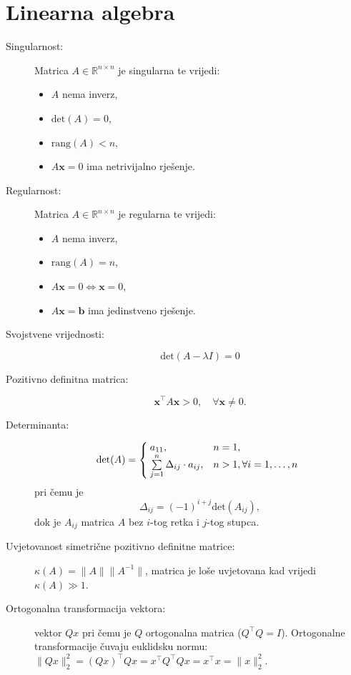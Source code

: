 \documentclass{article}
\begin{document}
\section{Linearna algebra}
\begin{description}
  \item[Singularnost:] Matrica $A \in \mathbb R^{n \times n}$ je singularna te vrijedi:
  \begin{itemize}
    \item $A$ nema inverz,
    \item $\textrm{det}(A) = 0$,
    \item $\textrm{rang}(A) < n$,
    \item $A \mathbf x = 0$ ima netrivijalno rješenje.
  \end{itemize}
  \item[Regularnost:] Matrica $A \in \mathbb R^{n \times n}$ je regularna te vrijedi:
  \begin{itemize}
    \item $A$ nema inverz,
    \item $\textrm{rang}(A) = n$,
    \item $A \mathbf x = 0 \Leftrightarrow \mathbf x = 0$, 
    \item $A \mathbf x = \mathbf b$ ima jedinstveno rješenje.
  \end{itemize}
  \item[Svojstvene vrijednosti:]
  $$\textrm{det}(A-\lambda I) = 0$$
  \item[Pozitivno definitna matrica:]
  $$\mathbf x^\top A \mathbf x > 0, \quad \forall \mathbf x \neq 0.$$
  \item[Determinanta:]
  $$\textrm{det}(A) = \left\{
    \begin{array}{@{\>}l@{\quad}l}
    a_{11}, & n = 1,\\
    \sum\limits_{j=1}^n \Delta_{ij}\cdot a_{ij}, & n > 1, \forall i = 1,\ldots ,n
    \end{array}
    \right.$$
  pri čemu je
  $$\Delta_{ij} = (-1)^{i+j} \textrm{det}(A_{ij}),$$
  dok je $A_{ij}$ matrica $A$ bez $i$-tog retka i $j$-tog stupca.
  \item[Uvjetovanost simetrične pozitivno definitne matrice:] $\kappa(A) = \|A\|\|A^{-1}\|$, matrica je loše uvjetovana kad vrijedi $\kappa(A)\gg 1$.
  \item[Ortogonalna transformacija vektora:] vektor $Qx$ pri čemu je $Q$ ortogonalna matrica ($Q^\top Q = I$). Ortogonalne transformacije čuvaju euklidsku normu: $\|Qx\|^2_2 = (Qx)^\top Qx = x^\top Q^\top Qx = x^\top x = \|x\|^2_2$.

\end{description}

\end{document}
